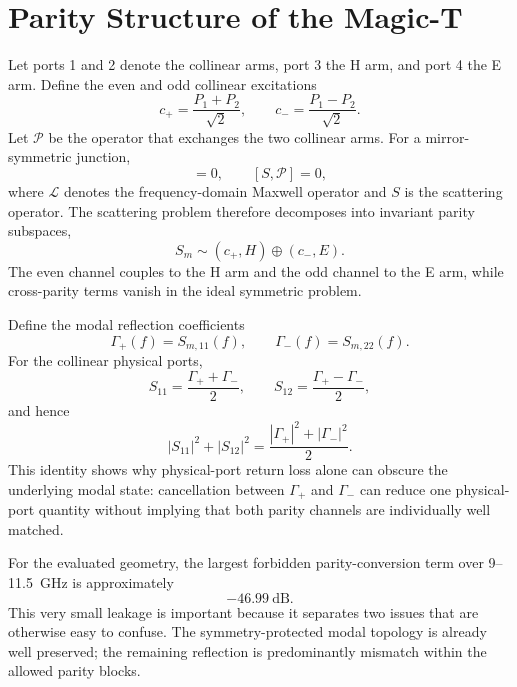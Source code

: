 \documentclass[journal]{IEEEtran}
\begin{document}
\section{Parity Structure of the Magic-T}
Let ports 1 and 2 denote the collinear arms, port 3 the H arm, and port 4 the E arm.
Define the even and odd collinear excitations
\begin{equation}
c_+=\frac{P_1+P_2}{\sqrt2},\qquad
c_-=\frac{P_1-P_2}{\sqrt2}.
\end{equation}
Let $\mathcal P$ be the operator that exchanges the two collinear arms.
For a mirror-symmetric junction,
\begin{equation}
[\mathcal L,\mathcal P]=0,\qquad [S,\mathcal P]=0,
\end{equation}
where $\mathcal L$ denotes the frequency-domain Maxwell operator and $S$ is the scattering operator.
The scattering problem therefore decomposes into invariant parity subspaces,
\begin{equation}
S_m\sim(c_+,H)\oplus(c_-,E).
\label{eq:block}
\end{equation}
The even channel couples to the H arm and the odd channel to the E arm, while cross-parity terms vanish in the ideal symmetric problem.

Define the modal reflection coefficients
\begin{equation}
\Gamma_+(f)=S_{m,11}(f),\qquad
\Gamma_-(f)=S_{m,22}(f).
\end{equation}
For the collinear physical ports,
\begin{equation}
S_{11}=\frac{\Gamma_++\Gamma_-}{2},\qquad
S_{12}=\frac{\Gamma_+-\Gamma_-}{2},
\end{equation}
and hence
\begin{equation}
|S_{11}|^2+|S_{12}|^2
=\frac{|\Gamma_+|^2+|\Gamma_-|^2}{2}.
\end{equation}
This identity shows why physical-port return loss alone can obscure the underlying modal state: cancellation between $\Gamma_+$ and $\Gamma_-$ can reduce one physical-port quantity without implying that both parity channels are individually well matched.

For the evaluated geometry, the largest forbidden parity-conversion term over 9--11.5~GHz is approximately
\begin{equation}
\boxed{-46.99~\mathrm{dB}}.
\end{equation}
This very small leakage is important because it separates two issues that are otherwise easy to confuse.
The symmetry-protected modal topology is already well preserved; the remaining reflection is predominantly mismatch within the allowed parity blocks.
\end{document}
